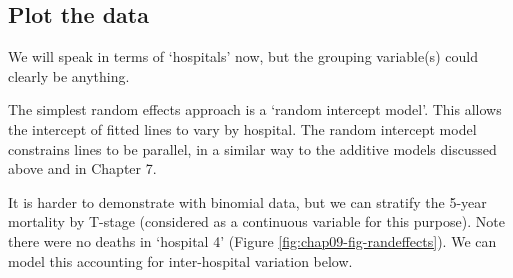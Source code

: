 \documentclass[
  12pt,
  krantz2]{krantz}
\makeatletter
\newenvironment{Shaded}{\begin{snugshade}}{\end{snugshade}}
\newcommand{\CommentTok}[1]{\textcolor[rgb]{0.56,0.35,0.01}{\textit{#1}}}
\newcommand{\DataTypeTok}[1]{\textcolor[rgb]{0.13,0.29,0.53}{#1}}
\newcommand{\DecValTok}[1]{\textcolor[rgb]{0.00,0.00,0.81}{#1}}
\newcommand{\KeywordTok}[1]{\textcolor[rgb]{0.13,0.29,0.53}{\textbf{#1}}}
\newcommand{\NormalTok}[1]{#1}
\newcommand{\OperatorTok}[1]{\textcolor[rgb]{0.81,0.36,0.00}{\textbf{#1}}}
\newcommand{\OtherTok}[1]{\textcolor[rgb]{0.56,0.35,0.01}{#1}}
\newcommand{\StringTok}[1]{\textcolor[rgb]{0.31,0.60,0.02}{#1}}
\newenvironment{kframe}{%
\medskip{}
\setlength{\fboxsep}{.8em}
 \def\at@end@of@kframe{}%
 \ifinner\ifhmode%
  \def\at@end@of@kframe{\end{minipage}}%
  \begin{minipage}{\columnwidth}%
 \fi\fi%
 \def\FrameCommand##1{\hskip\@totalleftmargin \hskip-\fboxsep
 \colorbox{shadecolor}{##1}\hskip-\fboxsep
     \hskip-\linewidth \hskip-\@totalleftmargin \hskip\columnwidth}%
 \MakeFramed {\advance\hsize-\width
   \@totalleftmargin\z@ \linewidth\hsize
   \@setminipage}}%
 {\par\unskip\endMakeFramed%
 \at@end@of@kframe}
\renewenvironment{Shaded}{\begin{kframe}}{\end{kframe}}
\makeatother
\begin{document}
\begin{Shaded}
\end{Shaded}

\hypertarget{plot-the-data-7}{%
\subsection{Plot the data}\label{plot-the-data-7}}

We will speak in terms of `hospitals' now, but the grouping variable(s) could clearly be anything.

The simplest random effects approach is a `random intercept model'.
This allows the intercept of fitted lines to vary by hospital.
The random intercept model constrains lines to be parallel, in a similar way to the additive models discussed above and in Chapter 7.

It is harder to demonstrate with binomial data, but we can stratify the 5-year mortality by T-stage (considered as a continuous variable for this purpose).
Note there were no deaths in `hospital 4' (Figure \ref{fig:chap09-fig-randeffects}).
We can model this accounting for inter-hospital variation below.
\end{document}
